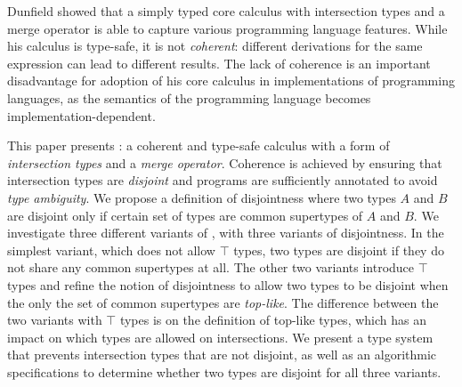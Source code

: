 Dunfield showed that a simply typed core calculus with intersection
types and a merge operator is able to capture various programming
language features. While his calculus is type-safe, it is not
\emph{coherent}: different derivations for the same expression can
lead to different results. The lack of coherence is an important
disadvantage for adoption of his core calculus in implementations of
programming languages, as the semantics of the programming language
becomes implementation-dependent.

This paper presents \name: a coherent and type-safe calculus with a
form of \emph{intersection types} and a \emph{merge
operator}. Coherence is achieved by ensuring that intersection types
are \emph{disjoint} and programs are sufficiently
annotated to avoid \emph{type ambiguity}. We propose a definition of disjointness where two
types $A$ and $B$ are disjoint only if certain set of types are common
supertypes of $A$ and $B$. We investigate three different variants of
\name, with three variants of disjointness. In the simplest
variant, which does not allow $\top$ types, two types are disjoint if
they do not share any common supertypes at all. The other two variants
introduce $\top$ types and refine the notion of disjointness to allow
two types to be disjoint when the only the set of common supertypes are
\emph{top-like}. The difference between the two variants with $\top$
types is on the definition of top-like types, which has an impact on
which types are allowed on intersections. We present a type system
that prevents intersection types that are not disjoint, as well as an
algorithmic specifications to determine whether two types are disjoint
for all three variants.